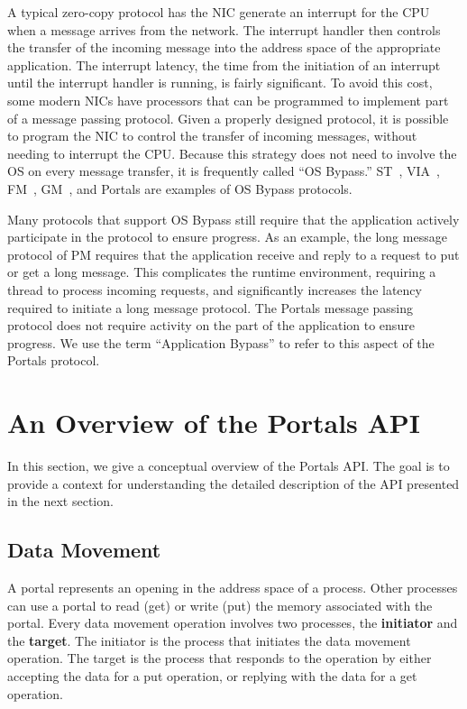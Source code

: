 \documentclass{sand-report}
\begin{document}
A typical zero-copy protocol has the NIC generate an interrupt for the
CPU when a message arrives from the network.  The interrupt handler
then controls the transfer of the incoming message into the address
space of the appropriate application.  The interrupt latency, the time
from the initiation of an interrupt until the interrupt handler is
running, is fairly significant.  To avoid this cost, some modern NICs
have processors that can be programmed to implement part of a message
passing protocol.  Given a properly designed protocol, it is possible
to program the NIC to control the transfer of incoming messages,
without needing to interrupt the CPU.  Because this strategy does not
need to involve the OS on every message transfer, it is frequently
called ``OS Bypass.''  ST~\cite{ST}, VIA~\cite{VIA}, FM~\cite{FM2},
GM~\cite{GM}, and Portals are examples of OS Bypass protocols.

Many protocols that support OS Bypass still require that the
application actively participate in the protocol to ensure progress.
As an example, the long message protocol of PM requires that the
application receive and reply to a request to put or get a long
message.  This complicates the runtime environment, requiring a thread
to process incoming requests, and significantly increases the latency
required to initiate a long message protocol.  The Portals message
passing protocol does not require activity on the part of the
application to ensure progress.  We use the term ``Application
Bypass'' to refer to this aspect of the Portals protocol.

\section{An Overview of the Portals API}\label{sec:apiover}

In this section, we give a conceptual overview of the Portals API.
The goal is to provide a context for understanding the detailed
description of the API presented in the next section.

\subsection{Data Movement}\label{sec:dmsemantics}

A portal represents an opening in the address space of a process.
Other processes can use a portal to read (get) or write (put) the
memory associated with the portal.  Every data movement operation
involves two processes, the \textbf{initiator} and the
\textbf{target}.  The initiator is the process that initiates the data
movement operation.  The target is the process that responds to the
operation by either accepting the data for a put operation, or
replying with the data for a get operation.
\end{document}
